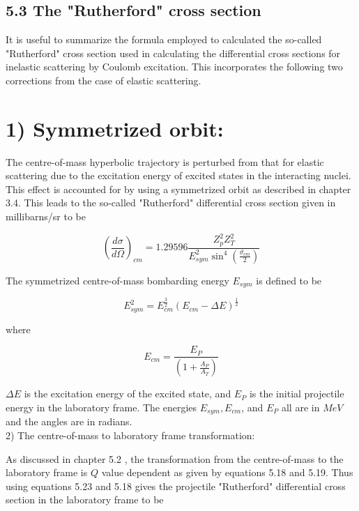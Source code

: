 \documentclass[10pt]{article}
\begin{document}
\subsection*{5.3 The "Rutherford" cross section}
It is useful to summarize the formula employed to calculated the so-called "Rutherford" cross section used in calculating the differential cross sections for inelastic scattering by Coulomb excitation. This incorporates the following two corrections from the case of elastic scattering.

\section*{1) Symmetrized orbit:}
The centre-of-mass hyperbolic trajectory is perturbed from that for elastic scattering due to the excitation energy of excited states in the interacting nuclei. This effect is accounted for by using a symmetrized orbit as described in chapter 3.4. This leads to the so-called "Rutherford" differential cross section given in millibarns/sr to be


\begin{equation*}
\left(\frac{d \sigma}{d \Omega}\right)_{c m}=1.29596 \frac{Z_{p}^{2} Z_{T}^{2}}{E_{s y m}^{2} \sin ^{4}\left(\frac{\vartheta_{c m}}{2}\right)} \tag{5.23}
\end{equation*}


The symmetrized centre-of-mass bombarding energy $E_{s y m}$ is defined to be


\begin{equation*}
E_{s y m}^{2}=E_{c m}^{\frac{3}{2}}\left(E_{c m}-\Delta E\right)^{\frac{1}{2}} \tag{5.24}
\end{equation*}


where


\begin{equation*}
E_{c m}=\frac{E_{P}}{\left(1+\frac{A_{P}}{A_{T}}\right)} \tag{5.25}
\end{equation*}


$\Delta E$ is the excitation energy of the excited state, and $E_{P}$ is the initial projectile energy in the laboratory frame. The energies $E_{s y m}, E_{c m}$, and $E_{P}$ all are in $M e V$ and the angles are in radians.\\
2) The centre-of-mass to laboratory frame transformation:

As discussed in chapter 5.2 , the transformation from the centre-of-mass to the laboratory frame is $Q$ value dependent as given by equations 5.18 and 5.19. Thus using equations 5.23 and 5.18 gives the projectile "Rutherford" differential cross section in the laboratory frame to be
\end{document}
